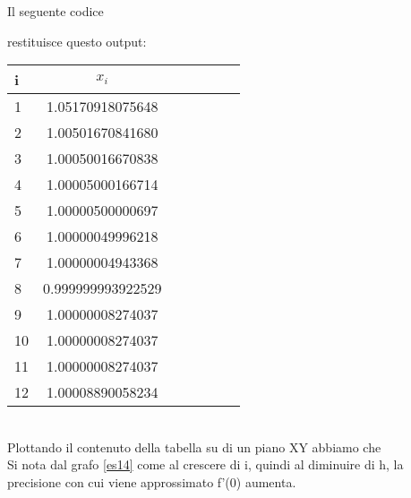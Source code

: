 Il seguente codice


restituisce questo output:

\begin{tabular}{l*{6}{c}}
i & \( x_i \)  \\
\hline
1 & 1.05170918075648  \\
2 & 1.00501670841680  \\
3 & 1.00050016670838  \\
4 & 1.00005000166714  \\
5 & 1.00000500000697  \\
6 & 1.00000049996218   \\
7 & 1.00000004943368   \\
8 & 0.999999993922529  \\
9 & 1.00000008274037  \\
10 & 1.00000008274037  \\
11 & 1.00000008274037   \\
12 & 1.00008890058234  \\
\end{tabular} \\

Plottando il contenuto della tabella su di un piano XY abbiamo che \\
Si nota dal grafo \ref{es14} come al crescere di i, quindi al diminuire di h, la precisione con cui viene approssimato f'(0) aumenta.
